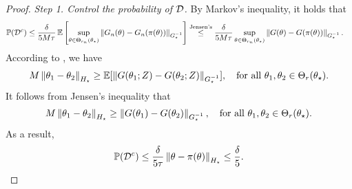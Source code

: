 \begin{proof}
    \emph{Step 1. Control the probability of $\mathcal{D}$.}
    By Markov's inequality, it holds that
    \begin{align*}
        \operatorname{\mathbb P}(\mathcal{D}^c)
        &\le \frac{\delta}{5M\tau} \operatorname{\mathbb E}\left[ \sup_{\theta \in \Theta_{r_n}(\theta_\star)} \left\lVert G_n(\theta) - G_n(\pi(\theta)) \right\rVert_{G_\star^{-1}} \right]
        \overset{\mbox{\scriptsize Jensen's}}{\le} \frac{\delta}{5M\tau} \sup_{\theta \in \Theta_{r_n}(\theta_\star)} \left\lVert G(\theta) - G(\pi(\theta)) \right\rVert_{G_\star^{-1}}.
    \end{align*}
    According to , we have
    \begin{align}\label{eq:lip_reformulation}
        M \left\lVert \theta_1 - \theta_2 \right\rVert_{H_\star} \ge \operatorname{\mathbb E}[\left\lVert G(\theta_1; Z) - G(\theta_2; Z) \right\rVert_{G_\star^{-1}}], \quad \mbox{for all } \theta_1, \theta_2 \in \Theta_r(\theta_\star).
    \end{align}
    It follows from Jensen's inequality that
    \begin{align}\label{eq:lip_jensen}
        M \left\lVert \theta_1 - \theta_2 \right\rVert_{H_\star} \ge \left\lVert G(\theta_1) - G(\theta_2) \right\rVert_{G_\star^{-1}}, \quad \mbox{for all } \theta_1, \theta_2 \in \Theta_r(\theta_\star).
    \end{align}
    As a result,
    \begin{align*}
        \operatorname{\mathbb P}(\mathcal{D}^c) \le \frac{\delta}{5\tau} \left\lVert \theta - \pi(\theta) \right\rVert_{H_\star} \le \frac{\delta}{5}.
    \end{align*}
    

\end{proof}
